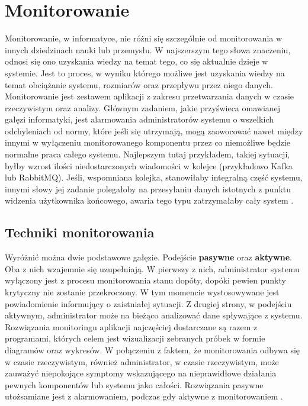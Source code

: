 \section{Monitorowanie}
    Monitorowanie, w informatyce, nie różni się szczególnie od monitorowania w innych dziedzinach nauki lub przemysłu. 
    W najszerszym tego słowa znaczeniu, odnosi się ono uzyskania wiedzy na temat tego, co się aktualnie dzieje w systemie.
    Jest to proces, w wyniku którego możliwe jest uzyskania wiedzy na temat obciążanie systemu, rozmiarów oraz przepływu przez niego
    danych. Monitorowanie jest zestawem aplikacji z zakresu przetwarzania danych w czasie rzeczywistym oraz analizy. 
    Głównym zadaniem, jakie przyświeca omawianej gałęzi informatyki, jest alarmowania administratorów systemu o wszelkich
    odchyleniach od normy, które jeśli się utrzymają, mogą zaowocować nawet między innymi w wyłączeniu monitorowanego
    komponentu przez co niemożliwe będzie normalne praca całego systemu. Najlepszym tutaj przykładem, takiej sytuacji, 
    byłby wzrost ilości niedostarczonych wiadomości w kolejce (przykładowo Kafka lub RabbitMQ). Jeśli, wspomniana kolejka,
    stanowiłaby integralną część systemu, innymi słowy jej zadanie polegałoby na przesyłaniu danych istotnych z punktu
    widzenia użytkownika końcowego, awaria tego typu zatrzymałaby cały system \cite{monitoring_and_alerting}.
    
    \subsection{Techniki monitorowania}
    Wyróżnić można dwie podstawowe gałęzie. Podejście \textbf{pasywne} oraz \textbf{aktywne}. Oba z nich wzajemnie się uzupełniają.
    W pierwszy z nich, administrator systemu wyłączony jest z procesu monitorowania stanu dopóty, dopóki pewien
    punkty krytyczny nie zostanie przekroczony. W tym momencie wystosowywane jest powiadomienie informujący o zaistniałej
    sytuacji. Z drugiej strony, w podejściu aktywnym, administrator może na bieżąco analizować dane spływające z systemu.
    Rozwiązania monitoringu aplikacji najczęściej dostarczane są razem z programami, których celem jest 
    wizualizacji zebranych próbek w formie diagramów oraz wykresów. W połączeniu z faktem, że monitorowania odbywa się
    w czasie rzeczywistym, również administrator, w czasie rzeczywistym, może zauważyć niepokojące symptomy wskazującego
    na nieprawidłowe działania pewnych komponentów lub systemu jako całości.
    Rozwiązania pasywne utożsamiane jest z alarmowaniem, podczas gdy aktywne z monitorowaniem \cite{monitoring_and_alerting}.
    
